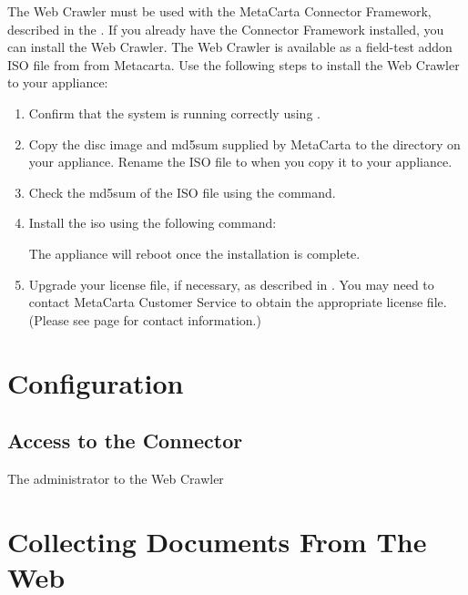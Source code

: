 \begin{changemargin}{1.5in}{0in}
The Web Crawler must be used with the MetaCarta Connector Framework,
described in the . If you
already have the Connector Framework installed, you can install the
Web Crawler.  The Web Crawler is available as a field-test addon
ISO file from from Metacarta. Use the following steps to install the
Web Crawler to your appliance:

\begin{enumerate}

\item Confirm that the system is running correctly using
.

\item Copy the disc image and md5sum supplied by MetaCarta to the
 directory on your appliance. Rename the ISO file to
 when you copy it to your appliance.

\item Check the md5sum of the ISO file using the  command.

\item Install the iso using the following command:


The appliance will reboot once the installation is complete.

\item Upgrade your license file, if necessary, as described in
. You may need
to contact MetaCarta Customer Service to obtain the appropriate
license file. (Please see page \pageref{SupportContact} for contact
information.)
 
\end{enumerate}

\section{Configuration}

\subsection{Access to the Connector}

The administrator to the Web Crawler 


\section{Collecting Documents From The Web} %


\end{changemargin}
